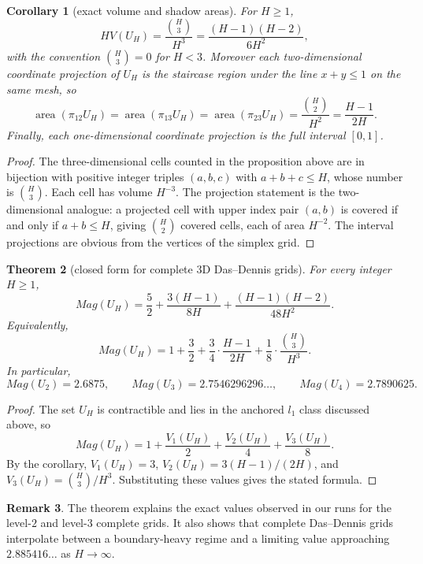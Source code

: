 \documentclass{article}
\def\ell{l}%
\def\HV{HV}%
\def\Mag{Mag}%
\newtheorem{theorem}{Theorem}[section]
\newtheorem{corollary}[theorem]{Corollary}
\theoremstyle{definition}
\newtheorem{remark}[theorem]{Remark}
\newcommand{\Mag}{\operatorname{Mag}}
\newcommand{\HV}{\operatorname{HV}}
\newcommand{\1}{\mathbf{1}}
\newcommand{\proj}{\pi}
\begin{document}
\begin{corollary}[exact volume and shadow areas]
For $H\ge 1$,
\[
\HV(U_H)=\frac{\binom{H}{3}}{H^3}=\frac{(H-1)(H-2)}{6H^2},
\]
with the convention $\binom{H}{3}=0$ for $H<3$. Moreover each two-dimensional coordinate projection of $U_H$ is the staircase region under the line $x+y\le 1$ on the same mesh, so
\[
\operatorname{area}(\proj_{12}U_H)=\operatorname{area}(\proj_{13}U_H)=\operatorname{area}(\proj_{23}U_H)=\frac{\binom{H}{2}}{H^2}=\frac{H-1}{2H}.
\]
Finally, each one-dimensional coordinate projection is the full interval $[0,1]$.
\end{corollary}

\begin{proof}
The three-dimensional cells counted in the proposition above are in bijection with positive integer triples $(a,b,c)$ with $a+b+c\le H$, whose number is $\binom{H}{3}$. Each cell has volume $H^{-3}$. The projection statement is the two-dimensional analogue: a projected cell with upper index pair $(a,b)$ is covered if and only if $a+b\le H$, giving $\binom{H}{2}$ covered cells, each of area $H^{-2}$. The interval projections are obvious from the vertices of the simplex grid.
\end{proof}

\begin{theorem}[closed form for complete 3D Das--Dennis grids]
For every integer $H\ge 1$,
\[
\boxed{\;
\Mag(U_H)=\frac52+\frac{3(H-1)}{8H}+\frac{(H-1)(H-2)}{48H^2}.\;}
\]
Equivalently,
\[
\Mag(U_H)=1+\frac{3}{2}+\frac{3}{4}\cdot \frac{H-1}{2H}+\frac{1}{8}\cdot \frac{\binom{H}{3}}{H^3}.
\]
In particular,
\[
\Mag(U_2)=2.6875,
\qquad
\Mag(U_3)=2.7546296296\ldots,
\qquad
\Mag(U_4)=2.7890625.
\]
\end{theorem}

\begin{proof}
The set $U_H$ is contractible and lies in the anchored $\ell_1$ class discussed above, so
\[
\Mag(U_H)=1+\frac{V_1(U_H)}{2}+\frac{V_2(U_H)}{4}+\frac{V_3(U_H)}{8}.
\]
By the corollary, $V_1(U_H)=3$, $V_2(U_H)=3(H-1)/(2H)$, and $V_3(U_H)=\binom{H}{3}/H^3$. Substituting these values gives the stated formula.
\end{proof}

\begin{remark}
The theorem explains the exact values observed in our runs for the level-$2$ and level-$3$ complete grids. It also shows that complete Das--Dennis grids interpolate between a boundary-heavy regime and a limiting value approaching $2.885416\ldots$ as $H\to\infty$.
\end{remark}
\end{document}

